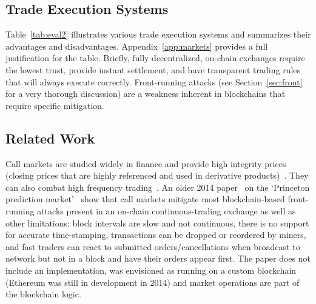 \subsection{Trade Execution Systems}



Table~\ref{tab:eval2} illustrates various trade execution systems and summarizes their advantages and disadvantages. Appendix~\ref{app:markets} provides a full justification for the table. Briefly, fully decentralized, on-chain exchanges require the lowest trust, provide instant settlement, and have transparent trading rules that will always execute correctly. Front-running attacks (see Section~\ref{sec:front} for a very thorough discussion) are a weakness inherent in blockchains that require specific mitigation.  

\subsection{Related Work}

Call markets are studied widely in finance and provide high integrity prices (\eg closing prices that are highly referenced and used in derivative products)~\cite{HS04,PS03,FH21}. They can also combat high frequency trading~\cite{budish2015high,aquilina2020quantifying}. An older 2014 paper~\cite{clark2014decentralizing} on the `Princeton prediction market'~\cite{Bra13} show that call markets  mitigate most blockchain-based front-running attacks present in an on-chain continuous-trading exchange as well as other limitations: block intervals are slow and not continuous, there is no support for accurate time-stamping, transactions can be dropped or reordered by miners, and fast traders can react to submitted orders/cancellations when broadcast to network but not in a block and have their orders appear first. The paper does not include an implementation, was envisioned as running on a custom blockchain (Ethereum was still in development in 2014) and market operations are part of the blockchain logic. 

